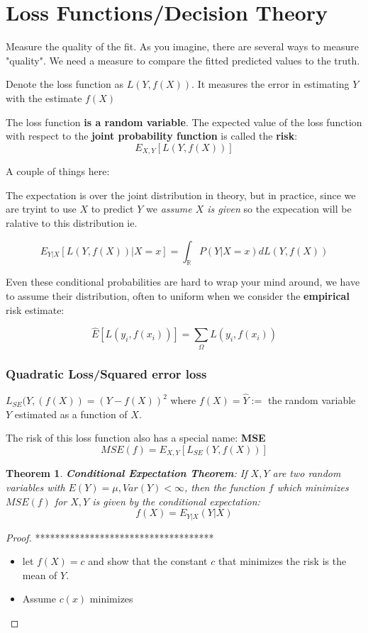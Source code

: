 \documentclass{article}
\newtheorem{theorem}{Theorem}
\begin{document}
\section{Loss Functions/Decision Theory}
Measure the quality of the fit. As you imagine, there are several ways to measure "quality".
We need a measure to compare the fitted predicted values to the truth. 

Denote the loss function as $L(Y, f(X))$. It measures the error in estimating $Y$ with the estimate $f(X)$

The loss function \textbf{is a random variable}. The expected value of the loss function with respect to the \textbf{joint probability function} is called the \textbf{risk}:
\[ E_{X,Y}[L(Y, f(X))] \]

A couple of things here:

The expectation is over the joint distribution in theory, but in practice, since we are tryint to use $X$ to predict $Y$ we \textit{assume $X$ is given} so the expecation will be ralative to this distribution ie. 

\[ E_{Y|X}[L(Y, f(X)) | X =x] = \int_{\mathbb{R}}  P(Y|X=x) dL(Y, f(X))\]  

Even these conditional probabilities are hard to wrap your mind around, we have to assume their distribution, often to uniform when we consider the \textbf{empirical} risk estimate:

\[ \hat E[L(y_i, f(x_i))] = \sum_{\Omega} L(y_i, f(x_i))\]  

\subsubsection{Quadratic Loss/Squared error loss}
$L_{SE}(Y, (f(X)) = (Y-f(X))^2$ where $f(X) = \hat Y :=$ the random variable $Y$ estimated as a function of $X$.

The risk of this loss function also has a special name: \textbf{MSE}
\[ MSE(f) = E_{X,Y}[L_{SE}(Y, f(X))] \]

\begin{theorem}
\textbf{Conditional Expectation Theorem}: If $X,Y$ are two random variables with $E(Y)=\mu, Var(Y) < \infty$, then the function $f$ which minimizes $MSE(f)$ for $X,Y$ is given by the conditional expectation:
\[f(X) = E_{Y|X}(Y|X) \]
\end{theorem}

\begin{proof}
************************************
\begin{itemize}
\item let $f(X) = c$ and show that the constant $c$ that minimizes the risk is the mean of $Y$.
\item Assume $c(x)$ minimizes 
\end{itemize}
\end{proof}
\end{document}
